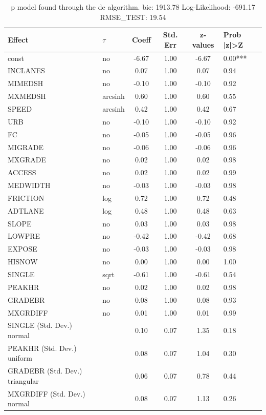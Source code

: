 \begin{table}
	\caption{p model found through the de algorithm. bic: 1913.78 Log-Likelihood: -691.17 RMSE_TEST: 19.54}
	\begin{center}
		\begin{tabular}{|l|l|c|c|c|l|}
			\hline
			Effect & $\tau$ & Coeff & Std. Err & z-values & Prob |z|>Z \\
			\hline
			const & no & -6.67 & 1.00 & -6.67 & 0.00*** \\
			\hline
			INCLANES & no & 0.07 & 1.00 & 0.07 & 0.94 \\
			\hline
			MIMEDSH & no & -0.10 & 1.00 & -0.10 & 0.92 \\
			\hline
			MXMEDSH & arcsinh & 0.60 & 1.00 & 0.60 & 0.55 \\
			\hline
			SPEED & arcsinh & 0.42 & 1.00 & 0.42 & 0.67 \\
			\hline
			URB & no & -0.10 & 1.00 & -0.10 & 0.92 \\
			\hline
			FC & no & -0.05 & 1.00 & -0.05 & 0.96 \\
			\hline
			MIGRADE & no & -0.06 & 1.00 & -0.06 & 0.96 \\
			\hline
			MXGRADE & no & 0.02 & 1.00 & 0.02 & 0.98 \\
			\hline
			ACCESS & no & 0.02 & 1.00 & 0.02 & 0.99 \\
			\hline
			MEDWIDTH & no & -0.03 & 1.00 & -0.03 & 0.98 \\
			\hline
			FRICTION & log & 0.72 & 1.00 & 0.72 & 0.48 \\
			\hline
			ADTLANE & log & 0.48 & 1.00 & 0.48 & 0.63 \\
			\hline
			SLOPE & no & 0.03 & 1.00 & 0.03 & 0.98 \\
			\hline
			LOWPRE & no & -0.42 & 1.00 & -0.42 & 0.68 \\
			\hline
			EXPOSE & no & -0.03 & 1.00 & -0.03 & 0.98 \\
			\hline
			HISNOW & no & 0.00 & 1.00 & 0.00 & 1.00 \\
			\hline
			SINGLE & sqrt & -0.61 & 1.00 & -0.61 & 0.54 \\
			\hline
			PEAKHR & no & 0.02 & 1.00 & 0.02 & 0.98 \\
			\hline
			GRADEBR & no & 0.08 & 1.00 & 0.08 & 0.93 \\
			\hline
			MXGRDIFF & no & 0.01 & 1.00 & 0.01 & 0.99 \\
			\hline
			SINGLE (Std. Dev.) normal &  & 0.10 & 0.07 & 1.35 & 0.18 \\
			\hline
			PEAKHR (Std. Dev.) uniform &  & 0.08 & 0.07 & 1.04 & 0.30 \\
			\hline
			GRADEBR (Std. Dev.) triangular &  & 0.06 & 0.07 & 0.78 & 0.44 \\
			\hline
			MXGRDIFF (Std. Dev.) normal &  & 0.08 & 0.07 & 1.13 & 0.26 \\
			\hline
		\end{tabular}
	\end{center}
\end{table}